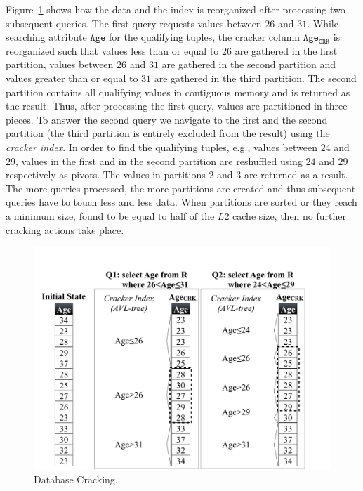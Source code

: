 Figure~\ref{fig:adaptive} shows how the data and the index is reorganized after
processing two subsequent queries. The first query requests values between $26$
and $31$. While searching attribute $\mathtt{Age}$ for the qualifying tuples,
the cracker column $\mathtt{Age_{CRK}}$ is reorganized such that values less than or equal to $26$ are gathered in the
first partition, values between $26$ and $31$ are gathered in the second
partition and values greater than or equal to $31$ are gathered in the third partition.
The second partition contains all qualifying values in contiguous memory and is
returned as the result. Thus, after processing the first query, values are
partitioned in three pieces. To answer the second query we navigate to the
first and the second partition (the third partition is entirely excluded from the
result) using the \emph{cracker index}. In order to find the qualifying tuples,
e.g., values between $24$ and $29$, values in the first and in the second 
partition are reshuffled using $24$ and $29$ respectively as pivots. The values
in partitions $2$ and $3$ are returned as a result. The more queries 
processed, the more partitions are created and thus subsequent queries have to
touch less and less data. When partitions are sorted or they reach a minimum size,
 found to be equal to half of the $L2$ cache size, then no further cracking 
actions take place.

\begin{figure}[t]
\begin{center}
\vspace*{3\baselineskip}
\includegraphics[trim=0cm 1cm 0cm 9cm, width=\columnwidth]{Figures/cracking_copy}
\caption{Database Cracking.}
\label{fig:adaptive}
\end{center}
\end{figure}

